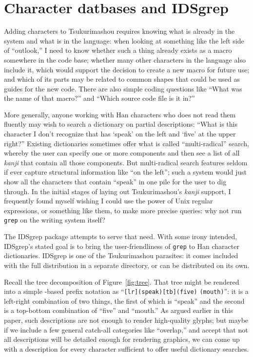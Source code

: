 \documentclass{ltugboat}
\begin{document}

\section{Character datbases and IDSgrep}

Adding characters to Tsukurimashou requires knowing what is already in the
system and what is in the language: when looking at something like the left
side of ``outlook,'' I need to know whether such a thing already exists as a
macro somewhere in the code base; whether many other characters in the
language also include it, which would support the decision to create a new
macro for future use; and which of its parts may be related to common shapes
that could be used as guides for the new code.  There are also simple coding
questions like ``What was the name of that macro?'' and ``Which source code
file is it in?''

More generally, anyone working with Han characters who does not read them
fluently may wish to search a dictionary on partial descriptions: ``What
is this character I don't recognize that has `speak' on the left and `five'
at the upper right?'' Existing dictionaries sometimes offer what is called
``multi-radical'' search, whereby the user can specify one or more
components and then see a list of all \emph{kanji} that contain all those
components.  But multi-radical
\linebreak%
 search features seldom if ever capture
structural information like ``on the left''; such a system would just show
all the characters that contain ``speak'' in one pile for the user to dig
through.  In the initial stages of laying out Tsukurimashou's \emph{kanji}
support, I frequently found myself wishing I could use the power of Unix
regular expressions, or something like them, to make more precise queries:
why not run \verb|grep| on the writing system itself?

The IDSgrep package attempts to serve that need.  With some irony intended,
IDSgrep's stated goal is to bring the user-friendliness of \verb|grep| to
Han character dictionaries.  IDSgrep is one of the Tsuku\-rimashou parasites:
it comes included with the full distribution in a separate directory, or can
be distributed on its own.

Recall the tree decomposition of Figure~\ref{fig:tree}.  That tree might be
rendered into a simple -based prefix notation as
``\verb|[lr](speak)[tb](five)|
\linebreak%
\verb|(mouth)|'':  it is a left-right combination of
two 
\linebreak%
things, the first of which is ``speak'' and the second is a top-bottom
combination of ``five'' and ``mouth.''  As argued earlier in this paper,
such descriptions are not enough to render high-quality glyphs; but maybe if
we include a few general catch-all categories like ``overlap,'' and accept
that not all descriptions will be detailed enough for rendering graphics, we
can come up with a description for every character sufficient to offer
useful dictionary searches.
\end{document}
